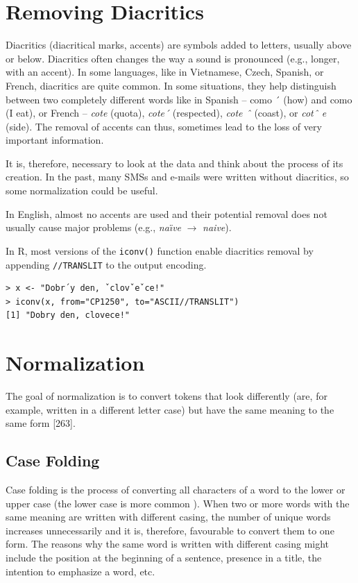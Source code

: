 \section{Removing Diacritics}

Diacritics (diacritical marks, accents) are symbols added to letters, usually above
or below. Diacritics often changes the way a sound is pronounced (e.g., longer,
with an accent). In some languages, like in Vietnamese, Czech, Spanish, or
French, diacritics are quite common. In some situations, they help distinguish between two completely different words like in Spanish – como ´ (how) and como
(I eat), or French – \textit{cote} (quota), \textit{cote´} (respected), \textit{cote ˆ} (coast), or \textit{cotˆ e} (side).
The removal of accents can thus, sometimes lead to the loss of very important
information.

It is, therefore, necessary to look at the data and think about the process of its
creation. In the past, many SMSs and e-mails were written without diacritics, so
some normalization could be useful.

In English, almost no accents are used and their potential removal does not
usually cause major problems (e.g., \textit{na\"{\i}ve} $\rightarrow$ \textit{naive}).

In R, most versions of the \texttt{iconv()} function enable diacritics removal by
appending \texttt{//TRANSLIT} to the output encoding.

\begin{verbatim}
> x <- "Dobr´y den, ˇclovˇeˇce!"
> iconv(x, from="CP1250", to="ASCII//TRANSLIT")
[1] "Dobry den, clovece!"
\end{verbatim}

\section{Normalization}

The goal of normalization is to convert tokens that look differently (are, for example, written in a different letter case) but have the same meaning to the same
form [263].

\subsection{Case Folding}

Case folding is the process of converting all characters of a word to the lower
or upper case (the lower case is more common \cite{ref62}). When two or more words
with the same meaning are written with different casing, the number of unique
words increases unnecessarily and it is, therefore, favourable to convert them
to one form. The reasons why the same word is written with different casing
might include the position at the beginning of a sentence, presence in a title, the
intention to emphasize a word, etc.

